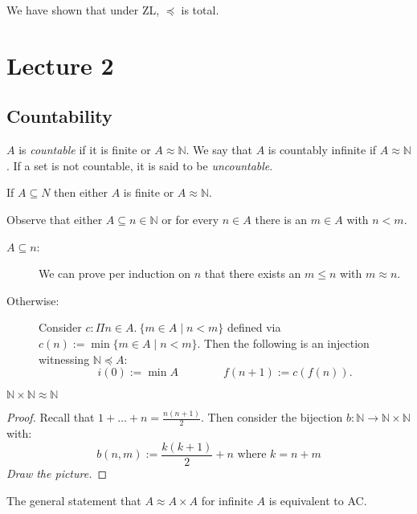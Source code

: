 \documentclass{whrartcl}
\newcommand{\NN}{\mathbb{N}}
\begin{document}
\begin{remark}
  We have shown that under ZL, $\preceq$ is total.
\end{remark}


\newpage

\section{Lecture 2}

\subsection*{Countability}

\begin{definition}
  $A$ is \emph{countable} if it is finite or $A \approx \NN$. We say that $A$ is
  countably infinite if $A \approx \NN$. If a set is not countable, it is said to
  be \emph{uncountable}.
\end{definition}

\begin{theorem}
  If $A \subseteq N$ then either $A$ is finite or $A \approx \NN$.
\end{theorem}
\begin{proofsketch}
  Observe that either $A \subseteq n \in \NN$ or for every $n \in A$ there is an
  $m \in A$ with $n < m$.
  \begin{description}
  \item[$A \subseteq n$:] We can prove per induction on $n$ that there exists an
    $m \leq n$ with $m \approx n$.
  \item[Otherwise:] Consider $c : \Pi n \in A.~\{m \in A \mid n <
    m\}$ defined via
    \(
      c(n) := \min \{m \in A \mid n < m\}
      \). Then the following is an injection witnessing $\NN \preceq A$:
      \[
        i(0) := \min A \qquad \qquad f(n + 1) := c(f(n)).
      \]
  \end{description}
\end{proofsketch}

\begin{lemma}
  $\NN \times \NN \approx \NN$
\end{lemma}
\begin{proof}
  Recall that $1 + \ldots + n = \frac{n(n + 1)}{2}$. Then consider the bijection
  $b : \NN \to \NN \times \NN$ with:
  \[b(n, m) := \frac{k(k + 1)}{2} + n \text{ where } k = n + m\]
  \emph{Draw the picture.}
\end{proof}
\begin{remark}
  The general statement that $A \approx A \times A$ for infinite $A$ is
  equivalent to AC.
\end{remark}
\end{document}
